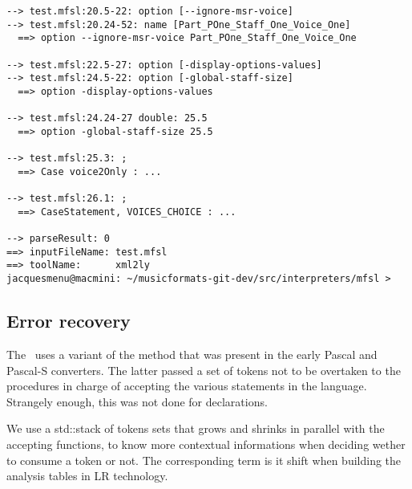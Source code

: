 \begin{lstlisting}[language=Terminal]
--> test.mfsl:20.5-22: option [--ignore-msr-voice]
--> test.mfsl:20.24-52: name [Part_POne_Staff_One_Voice_One]
  ==> option --ignore-msr-voice Part_POne_Staff_One_Voice_One

--> test.mfsl:22.5-27: option [-display-options-values]
--> test.mfsl:24.5-22: option [-global-staff-size]
  ==> option -display-options-values

--> test.mfsl:24.24-27 double: 25.5
  ==> option -global-staff-size 25.5

--> test.mfsl:25.3: ;
  ==> Case voice2Only : ...

--> test.mfsl:26.1: ;
  ==> CaseStatement, VOICES_CHOICE : ...

--> parseResult: 0
==> inputFileName: test.mfsl
==> toolName:      xml2ly
jacquesmenu@macmini: ~/musicformats-git-dev/src/interpreters/mfsl >
\end{lstlisting}


\subsection{Error recovery}

The \mfslInterp\ uses a variant of the  method that was present in the early Pascal and Pascal-S converters. The latter passed a set of tokens not to be overtaken to the procedures in charge of accepting the various statements in the language. Strangely enough, this was not done for declarations.

We use a std::stack of tokens sets that grows and shrinks in parallel with the accepting functions, to know more contextual informations when deciding wether to consume a token or not. The corresponding term is {it shift}
when building the analysis tables in LR technology.


